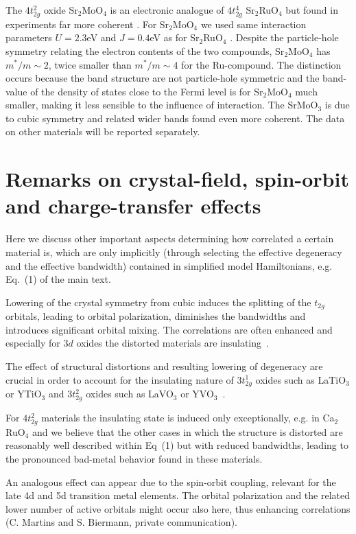 \documentclass[aps,prl,amsmath, amssymb, english, aps, prl, onecolumn,
  reprint,floatfix, superscriptaddress]{revtex4-1}
\begin{document}
The $4t_{2g}^2$ oxide Sr$_2$MoO$_4$ is an electronic analogue of
$4t_{2g}^4$ Sr$_2$RuO$_4$ but found in experiments far more coherent
\cite{ikeda_Sr2MoO4_jpsj_2000}. For Sr$_2$MoO$_4$ we used same
interaction parameters $U=2.3$eV and $J=0.4$eV as for Sr$_2$RuO$_4$
\cite{mravlje11}. Despite the particle-hole symmetry relating the
electron contents of the two compounds, Sr$_2$MoO$_4$ has $m^*/m \sim
2$, twice smaller than $m^*/m \sim 4$ for the Ru-compound. The
distinction occurs because the band structure are not particle-hole
symmetric and the band-value of the density of states close to the
Fermi level is for Sr$_2$MoO$_4$ much smaller, making it less sensible
to the influence of interaction. The SrMoO$_3$ is due to cubic
symmetry and related wider bands  found even more
coherent.  The data on other materials will be reported separately.


\section{Remarks on crystal-field, spin-orbit and charge-transfer effects}
Here we discuss other important aspects determining how
correlated a certain material is, which are only implicitly (through
selecting the effective degeneracy and the effective bandwidth)
contained in simplified model Hamiltonians, e.g. Eq.~(1) of the
main text. 

Lowering of the crystal symmetry from cubic induces the splitting of the $t_{2g}$ orbitals, leading to orbital polarization, diminishes the bandwidths and introduces
significant orbital mixing. The correlations are often enhanced and
especially for $3d$ oxides the distorted materials are
insulating~\cite{manini_orbital_2002_prb,pavarini04,poteryaev_crystalfield_prb_2008,werner07_hilowspin}.

The effect of structural distortions and resulting lowering of
degeneracy are crucial in order to account for the insulating nature
of $3t_{2g}^1$ oxides such as LaTiO$_3$ or YTiO$_3$ \cite{pavarini04}
 and $3t_{2g}^2$ oxides such as LaVO$_3$ or
YVO$_3$~\cite{ray_d2vanadates_prl_2007}.

 For $4t_{2g}^2$ materials the insulating state is induced only
 exceptionally, e.g. in Ca$_2$RuO$_4$ \cite{cao97} 
 and we believe that the other cases in which the structure is distorted are reasonably well described within
 Eq~(1) but with reduced bandwidths, leading to the pronounced bad-metal
 behavior found in these materials\cite{nakatsuji03}.

An analogous effect can appear due to the spin-orbit coupling,
relevant for the late 4d and 5d transition metal elements. The orbital
polarization and the related lower number of active orbitals might
occur also here, thus enhancing correlations (C. Martins and S. Biermann, private communication).
\end{document}
